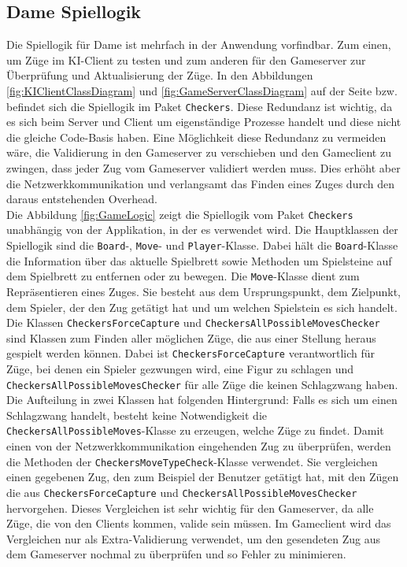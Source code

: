 \documentclass[12pt,a4paper,bibliography=totocnumbered,listof=totocnumbered]{article}
\begin{document}
\subsection{Dame Spiellogik}
\label{chap:Spiellogik}
Die Spiellogik für Dame ist mehrfach in der Anwendung vorfindbar. Zum einen, um Züge im \ac{KI}-Client zu testen und zum anderen
für den Gameserver zur Überprüfung und Aktualisierung der Züge. In den Abbildungen \ref{fig:KIClientClassDiagram} und \ref{fig:GameServerClassDiagram} 
auf der Seite \pageref{fig:KIClientClassDiagram} bzw. \pageref{fig:GameServerClassDiagram}
befindet sich die Spiellogik im Paket \texttt{Checkers}. Diese Redundanz ist wichtig, da es sich beim Server und Client um eigenständige Prozesse handelt 
und diese nicht die gleiche Code-Basis haben. Eine Möglichkeit diese Redundanz zu vermeiden wäre, die Validierung in den Gameserver zu verschieben und 
den Gameclient zu zwingen, dass jeder Zug vom Gameserver validiert werden muss. Dies erhöht aber die Netzwerkkommunikation und verlangsamt das Finden eines Zuges 
durch den daraus entstehenden Overhead.
\\
Die Abbildung \ref{fig:GameLogic} zeigt die Spiellogik vom Paket \texttt{Checkers} unabhängig von der Applikation, in der es verwendet wird.
Die Hauptklassen der Spiellogik sind die \texttt{Board}-, \texttt{Move}- und \texttt{Player}-Klasse. Dabei hält die \texttt{Board}-Klasse die Information über das aktuelle Spielbrett sowie 
Methoden um Spielsteine auf dem Spielbrett zu entfernen oder zu bewegen. 
Die \texttt{Move}-Klasse dient zum Repräsentieren eines Zuges. Sie besteht aus dem 
Ursprungspunkt, dem Zielpunkt, dem Spieler, der den Zug getätigt hat und um welchen Spielstein es sich handelt. 
\\
Die Klassen \texttt{CheckersForceCapture} und \texttt{CheckersAllPossibleMovesChecker} sind Klassen zum Finden aller möglichen Züge, die aus einer Stellung heraus gespielt werden
können. Dabei ist \texttt{CheckersForceCapture} verantwortlich für Züge, bei denen ein Spieler gezwungen wird, eine Figur zu schlagen und \texttt{CheckersAllPossibleMovesChecker} 
für alle Züge die keinen Schlagzwang haben. Die Aufteilung in zwei Klassen hat folgenden Hintergrund: Falls es sich um einen Schlagzwang handelt, besteht keine Notwendigkeit 
die \texttt{CheckersAllPossibleMoves}-Klasse zu erzeugen, welche Züge zu findet. Damit einen von der Netzwerkkommunikation eingehenden Zug zu überprüfen, 
werden die Methoden der \texttt{CheckersMoveTypeCheck}-Klasse verwendet. Sie vergleichen einen gegebenen Zug, 
den zum Beispiel der Benutzer getätigt hat, mit den Zügen die aus \texttt{CheckersForceCapture} und \texttt{CheckersAllPossibleMovesChecker}
hervorgehen. Dieses Vergleichen ist sehr wichtig für den Gameserver, da alle Züge, die von den Clients kommen, valide sein müssen. Im Gameclient wird das Vergleichen nur 
als Extra-Validierung verwendet, um den gesendeten Zug aus dem Gameserver nochmal zu überprüfen und so Fehler zu minimieren.
\\
\end{document}
